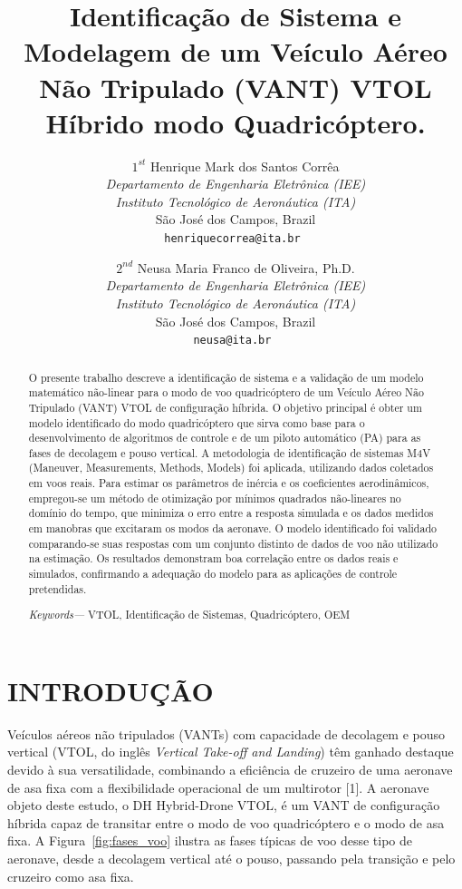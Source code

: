 \documentclass[letterpaper, 10 pt, conference]{ieeeconf}
\title{\LARGE \bf
Identificação de Sistema e Modelagem de um Veículo Aéreo Não Tripulado (VANT) VTOL Híbrido modo Quadricóptero.
}
\author{$1^{st}$ Henrique Mark dos Santos Corrêa%
\\
\textit{Departamento de Engenharia Eletrônica (IEE)} \\
\textit{Instituto Tecnológico de Aeronáutica (ITA)} \\
São José dos Campos, Brazil \\
\tt\small henriquecorrea@ita.br
\and
$2^{nd}$ Neusa Maria Franco de Oliveira, Ph.D.\\
\textit{Departamento de Engenharia Eletrônica (IEE)} \\
\textit{Instituto Tecnológico de Aeronáutica (ITA)} \\
São José dos Campos, Brazil \\
\tt\small neusa@ita.br
}
\begin{document}
\maketitle
\thispagestyle{empty}
\pagestyle{empty}

\begin{abstract}
O presente trabalho descreve a identificação de sistema e a validação de um modelo matemático não-linear para o modo de voo quadricóptero de um Veículo Aéreo Não Tripulado (VANT) VTOL de configuração híbrida. O objetivo principal é obter um modelo identificado do modo quadricóptero que sirva como base para o desenvolvimento de algoritmos de controle e de um piloto automático (PA) para as fases de decolagem e pouso vertical. A metodologia de identificação de sistemas M4V (Maneuver, Measurements, Methods, Models) foi aplicada, utilizando dados coletados em voos reais. Para estimar os parâmetros de inércia e os coeficientes aerodinâmicos, empregou-se um método de otimização por mínimos quadrados não-lineares no domínio do tempo, que minimiza o erro entre a resposta simulada e os dados medidos em manobras que excitaram os modos da aeronave. O modelo identificado foi validado comparando-se suas respostas com um conjunto distinto de dados de voo não utilizado na estimação. Os resultados demonstram boa correlação entre os dados reais e simulados, confirmando a adequação do modelo para as aplicações de controle pretendidas.

\textit{Keywords—} VTOL, Identificação de Sistemas, Quadricóptero, OEM
\end{abstract}


\section{INTRODUÇÃO}

Veículos aéreos não tripulados (VANTs) com capacidade de decolagem e pouso vertical (VTOL, do inglês \textit{Vertical Take-off and Landing}) têm ganhado destaque devido à sua versatilidade, combinando a eficiência de cruzeiro de uma aeronave de asa fixa com a flexibilidade operacional de um multirotor [1]. A aeronave objeto deste estudo, o DH Hybrid-Drone VTOL, é um VANT de configuração híbrida capaz de transitar entre o modo de voo quadricóptero e o modo de asa fixa. A Figura~\ref{fig:fases_voo} ilustra as fases típicas de voo desse tipo de aeronave, desde a decolagem vertical até o pouso, passando pela transição e pelo cruzeiro como asa fixa.
\end{document}
